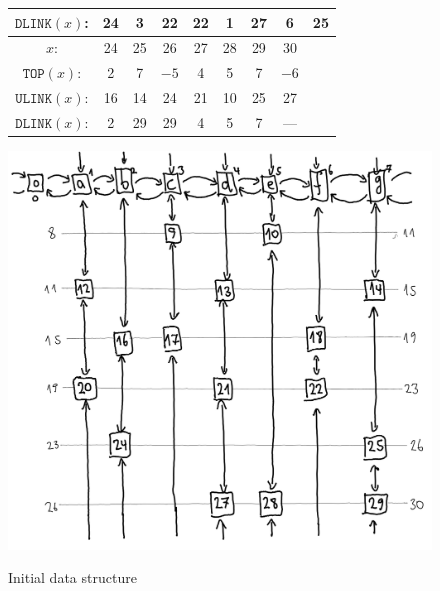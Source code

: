 \documentclass[a4paper,landscape,11pt]{article}
\begin{document}
\begin{figure}[H]
\begin{minipage}[t]{0.48\linewidth}
\begin{tabular}{c c c c c c c c c}
			$\texttt{DLINK}(x)$: & 24  & 3  & 22   & 22   & 1  & 27 & 6    & 25   \\
			\hline
			$x$:                 & 24  & 25 & 26   & 27   & 28 & 29 & 30   &      \\
			$\texttt{TOP}(x)$:   & 2   & 7  & $-5$ & 4    & 5  & 7  & $-6$ &      \\
			$\texttt{ULINK}(x)$: & 16  & 14 & 24   & 21   & 10 & 25 & 27   &      \\
			$\texttt{DLINK}(x)$: & 2   & 29 & 29   & 4    & 5  & 7  & ---  &      \\
		\end{tabular}
		\label{tab:initial_memory_layout}
	\end{minipage}
	\hfill
	\begin{minipage}[t]{0.48\linewidth}
		\centering
		\caption{Initial data structure}
		\includegraphics[width=\linewidth]{vol4b_ex11_p125_1.png}
		\label{fig:initial_data_structure}
	\end{minipage}
\end{figure}
\end{document}
